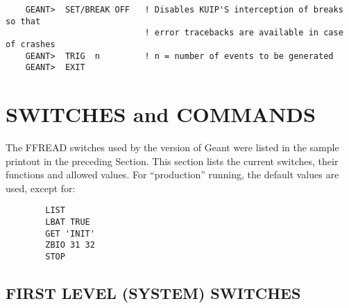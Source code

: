 \begin{verbatim}
    GEANT>  SET/BREAK OFF   ! Disables KUIP'S interception of breaks so that
                            ! error tracebacks are available in case of crashes
    GEANT>  TRIG  n         ! n = number of events to be generated
    GEANT>  EXIT
\end{verbatim}

\section{SWITCHES and COMMANDS}
\label{switch}

The FFREAD switches used by the  version of Geant were listed in the sample
printout in the preceding Section. This section lists the current switches,
their functions and allowed values. For ``production'' running, the default
values are used, except for:

\begin{verbatim}
        LIST
        LBAT TRUE
        GET 'INIT'
        ZBIO 31 32
        STOP
\end{verbatim}

\subsection{FIRST LEVEL (SYSTEM) SWITCHES}

